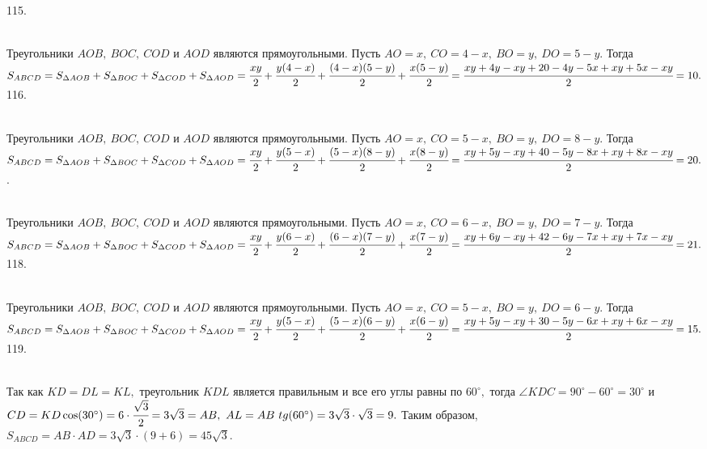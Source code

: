 115. \begin{figure}[ht!]
\end{figure}\\
Треугольники $AOB,\ BOC,\ COD$ и $AOD$ являются прямоугольными. Пусть $AO=x,\ CO=4-x,\ BO=y,\ DO=5-y.$ Тогда $S_{ABCD}=S_{\Delta AOB}+S_{\Delta BOC}+S_{\Delta COD}+S_{\Delta AOD}=\cfrac{xy}{2}+\cfrac{y(4-x)}{2}+\cfrac{(4-x)(5-y)}{2}+\cfrac{x(5-y)}{2}=\cfrac{xy+4y-xy+20-4y-5x+xy+5x-xy}{2}=10.$\\
116. \begin{figure}[ht!]
\end{figure}\\
Треугольники $AOB,\ BOC,\ COD$ и $AOD$ являются прямоугольными. Пусть $AO=x,\ CO=5-x,\ BO=y,\ DO=8-y.$ Тогда $S_{ABCD}=S_{\Delta AOB}+S_{\Delta BOC}+S_{\Delta COD}+S_{\Delta AOD}=\cfrac{xy}{2}+\cfrac{y(5-x)}{2}+\cfrac{(5-x)(8-y)}{2}+\cfrac{x(8-y)}{2}=\cfrac{xy+5y-xy+40-5y-8x+xy+8x-xy}{2}=20.$\newpage{}. \begin{figure}[ht!]
\end{figure}\\
Треугольники $AOB,\ BOC,\ COD$ и $AOD$ являются прямоугольными. Пусть $AO=x,\ CO=6-x,\ BO=y,\ DO=7-y.$ Тогда $S_{ABCD}=S_{\Delta AOB}+S_{\Delta BOC}+S_{\Delta COD}+S_{\Delta AOD}=\cfrac{xy}{2}+\cfrac{y(6-x)}{2}+\cfrac{(6-x)(7-y)}{2}+\cfrac{x(7-y)}{2}=\cfrac{xy+6y-xy+42-6y-7x+xy+7x-xy}{2}=21.$\\
118. \begin{figure}[ht!]
\end{figure}\\
Треугольники $AOB,\ BOC,\ COD$ и $AOD$ являются прямоугольными. Пусть $AO=x,\ CO=5-x,\ BO=y,\ DO=6-y.$ Тогда $S_{ABCD}=S_{\Delta AOB}+S_{\Delta BOC}+S_{\Delta COD}+S_{\Delta AOD}=\cfrac{xy}{2}+\cfrac{y(5-x)}{2}+\cfrac{(5-x)(6-y)}{2}+\cfrac{x(6-y)}{2}=\cfrac{xy+5y-xy+30-5y-6x+xy+6x-xy}{2}=15.$\\
119. \begin{figure}[ht!]
\end{figure}\\
Так как $KD=DL=KL,$ треугольник $KDL$ является правильным и все его углы равны по $60^\circ,$ тогда $\angle KDC=90^\circ-60^\circ=30^\circ$ и $CD=KD\cos(30^\circ)=6\cdot\cfrac{\sqrt{3}}{2}=3\sqrt{3}=AB,\ AL=AB\ tg(60^\circ)=3\sqrt{3}\cdot\sqrt{3}=9.$ Таким образом, $S_{ABCD}=AB\cdot AD=3\sqrt{3}\cdot(9+6)=45\sqrt{3}.$\\
